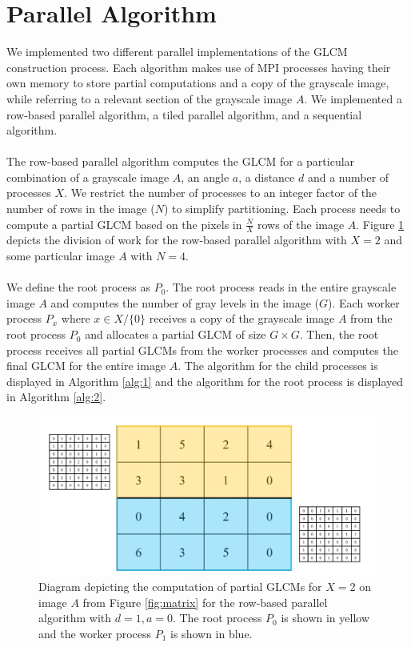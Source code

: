 \documentclass{article}
\begin{document}
\section{Parallel Algorithm}
    We implemented two different parallel implementations of the GLCM construction process. Each algorithm makes use of MPI processes having their own memory to store partial computations and a copy of the grayscale image, while referring to a relevant section of the grayscale image $A$. We implemented a row-based parallel algorithm, a tiled parallel algorithm, and a sequential algorithm. \\ \\ 
    The row-based parallel algorithm computes the GLCM for a particular combination of a grayscale image $A$, an angle $a$, a distance $d$ and a number of processes $X$. We restrict the number of processes to an integer factor of the number of rows in the image ($N$) to simplify partitioning. Each process needs to compute a partial GLCM based on the pixels in $\frac{N}{X}$ rows of the image $A$. Figure \ref{fig:rows} depicts the division of work for the row-based parallel algorithm with $X = 2$ and some particular image $A$ with $N = 4$. \\ \\ 
    We define the root process as $P_0$. The root process reads in the entire grayscale image $A$ and computes the number of gray levels in the image ($G$). Each worker process $P_x$ where $x \in X / \{0\}$ receives a copy of the grayscale image $A$ from the root process $P_0$ and allocates a partial GLCM of size $G \times G$. Then, the root process receives all partial GLCMs from the worker processes and computes the final GLCM for the entire image $A$. The algorithm for the child processes is displayed in Algorithm \ref{alg:1} and the algorithm for the root process is displayed in Algorithm \ref{alg:2}.
    \begin{figure}
      \includegraphics[width=\linewidth]{row_partitioning.jpg}
      \caption{Diagram depicting the computation of partial GLCMs for $X = 2$ on image $A$ from Figure \ref{fig:matrix} for the row-based parallel algorithm with $d = 1, a = 0$. The root process $P_0$ is shown in yellow and the worker process $P_1$ is shown in blue. }
      \label{fig:rows}
    \end{figure}
\end{document}
